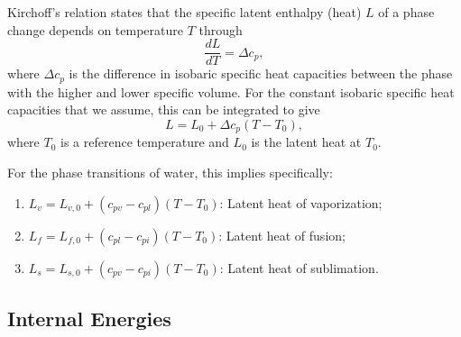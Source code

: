 \documentclass{report}
\begin{document}
Kirchoff's relation states that the specific latent enthalpy (heat) $L$ of a phase change depends on temperature $T$ through
\begin{equation}
    \frac{dL}{dT} = \Delta c_p,
\end{equation}
where $\Delta c_p$ is the difference in isobaric specific heat capacities between the phase with the higher and lower specific volume. For the constant isobaric specific heat capacities that we assume, this can be integrated to give
\begin{equation}
    L = L_0 + \Delta c_p (T-T_0),
    \label{eq:LH_temperature}
\end{equation}
where $T_0$ is a reference temperature and $L_0$ is the latent heat at $T_0$. 

For the phase transitions of water, this implies specifically:
\begin{enumerate}
    \item $L_v = L_{v,0} + (c_{pv} - c_{pl}) (T - T_0)$: Latent heat of vaporization;
    \item $L_f = L_{f,0} + (c_{pl} - c_{pi}) (T - T_0)$: Latent heat of fusion;
    \item $L_s = L_{s,0} + (c_{pv} - c_{pi}) (T - T_0)$: Latent heat of sublimation.
\end{enumerate}

\subsection{Internal Energies}\label{s:internal_energies}
\end{document}
